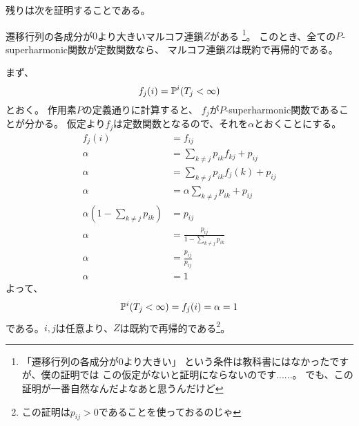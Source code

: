         残りは次を証明することである。
        \begin{center}
          遷移行列の各成分が$0$より大きいマルコフ連鎖$Z$がある
          \footnote{「遷移行列の各成分が$0$より大きい」
          という条件は教科書にはなかったですが、僕の証明では
          この仮定がないと証明にならないのです......。
          でも、この証明が一番自然なんだよなあと思うんだけど}。
          このとき、全ての$P$-superharmonic関数が定数関数なら、
          マルコフ連鎖$Z$は既約で再帰的である。
        \end{center}

        まず、
        \[
          f_j(i) = {\mathbb{P}}^i(T_j < \infty)
        \]
        とおく。
        作用素$P$の定義通りに計算すると、
        $f_j$が$P$-superharmonic関数であることが分かる。
        仮定より$f_j$は定数関数となるので、それを$\alpha$とおくことにする。
        \begin{align*}
          f_j(i) &= f_{ij}\\
          \alpha &= \sum_{k \neq j} p_{ik}f_{kj} + p_{ij}\\
          \alpha &= \sum_{k \neq j} p_{ik}f_j(k) + p_{ij}\\
          \alpha &= \alpha\sum_{k \neq j} p_{ik} + p_{ij}\\
          \alpha \left(1 - \sum_{k \neq j} p_{ik} \right) &= p_{ij}\\
          \alpha &= \frac{p_{ij}}{1 - \sum_{k \neq j} p_{ik}}\\
          \alpha &= \frac{p_{ij}}{p_{ij}}\\
          \alpha &= 1
        \end{align*}
        よって、
        \[
          {\mathbb{P}}^i(T_j < \infty) =f_{j}(i) = \alpha = 1
        \]
        である。$i,j$は任意より、$Z$は既約で再帰的である\footnote{この証明は$p_{ij} > 0$であることを使っておるのじゃ}。
